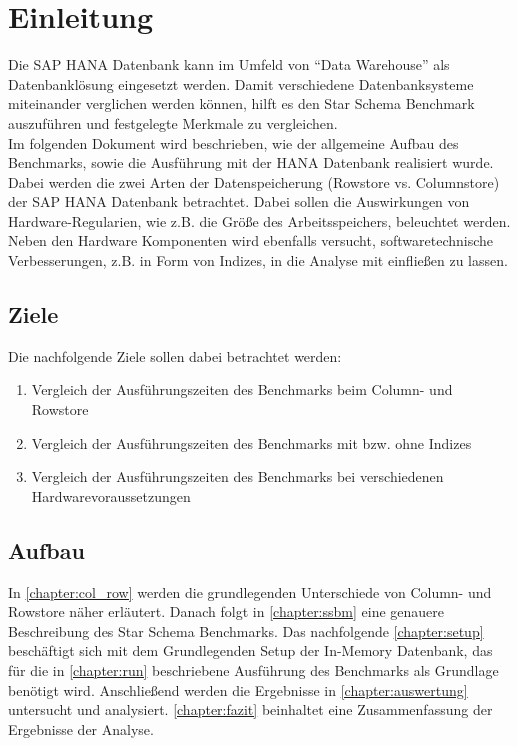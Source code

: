 \chapter{Einleitung}

Die SAP HANA Datenbank kann im Umfeld von \enquote{Data Warehouse} als Datenbanklösung eingesetzt werden. Damit verschiedene Datenbanksysteme miteinander verglichen werden können, hilft es den Star Schema Benchmark auszuführen und festgelegte Merkmale zu vergleichen.\\Im folgenden Dokument wird beschrieben, wie der allgemeine Aufbau des Benchmarks, sowie die Ausführung mit der HANA Datenbank realisiert wurde. Dabei werden die zwei Arten der Datenspeicherung (Rowstore vs. Columnstore) der SAP HANA Datenbank betrachtet. Dabei sollen die Auswirkungen von Hardware-Regularien, wie z.B. die Größe des Arbeitsspeichers, beleuchtet werden. Neben den Hardware Komponenten wird ebenfalls versucht, softwaretechnische Verbesserungen, z.B. in Form von Indizes, in die Analyse mit einfließen zu lassen.

\section{Ziele}
Die nachfolgende Ziele sollen dabei betrachtet werden:
\begin{enumerate}
	\item Vergleich der Ausführungszeiten des Benchmarks beim Column- und Rowstore
	\item Vergleich der Ausführungszeiten des Benchmarks mit bzw. ohne Indizes
	\item Vergleich der Ausführungszeiten des Benchmarks bei verschiedenen Hardwarevoraussetzungen
\end{enumerate}

\section{Aufbau}
In \autoref{chapter:col_row} werden die grundlegenden Unterschiede von Column- 
und Rowstore näher erläutert. Danach folgt in \autoref{chapter:ssbm} eine genauere Beschreibung 
des Star Schema Benchmarks. Das nachfolgende \autoref{chapter:setup} beschäftigt sich mit 
dem Grundlegenden Setup der In-Memory Datenbank, das für die in \autoref{chapter:run} 
beschriebene Ausführung des Benchmarks als Grundlage benötigt wird. Anschließend werden die Ergebnisse
in \autoref{chapter:auswertung} untersucht und analysiert. \autoref{chapter:fazit} beinhaltet eine Zusammenfassung der
Ergebnisse der Analyse.

